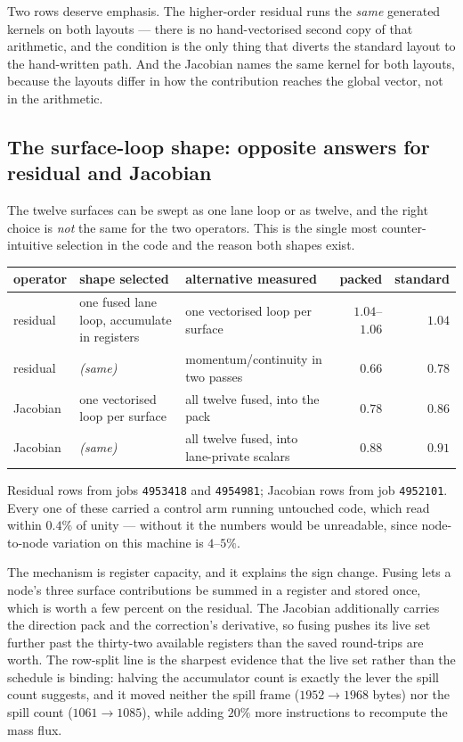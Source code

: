 Two rows deserve emphasis. The higher-order residual runs the \emph{same} generated kernels on
both layouts --- there is no hand-vectorised second copy of that arithmetic, and the
 condition is the only thing that diverts the standard layout to the hand-written
path. And the Jacobian names the same kernel for both layouts, because the layouts differ in how
the contribution reaches the global vector, not in the arithmetic.

\subsection{The surface-loop shape: opposite answers for residual and Jacobian}
\label{sec:sel:shape}

The twelve surfaces can be swept as one lane loop or as twelve, and the right choice is
\emph{not} the same for the two operators. This is the single most counter-intuitive selection in
the code and the reason both shapes exist.

\begin{center}
\footnotesize
\begin{tabular}{@{}lllrr@{}}
\toprule
operator & shape selected & alternative measured & packed & standard \\
\midrule
residual   & one fused lane loop, accumulate in registers
           & one vectorised loop per surface & $1.04$--$1.06$ & $1.04$ \\
residual   & \emph{(same)}
           & momentum/continuity in two passes & $0.66$ & $0.78$ \\
Jacobian   & one vectorised loop per surface
           & all twelve fused, into the pack & $0.78$ & $0.86$ \\
Jacobian   & \emph{(same)}
           & all twelve fused, into lane-private scalars & $0.88$ & $0.91$ \\
\bottomrule
\end{tabular}
\end{center}

\noindent
Residual rows from jobs \texttt{4953418} and \texttt{4954981}; Jacobian rows from job
\texttt{4952101}. Every one of these carried a control arm running untouched code, which read
within $0.4\%$ of unity --- without it the numbers would be unreadable, since node-to-node
variation on this machine is $4$--$5\%$.

The mechanism is register capacity, and it explains the sign change. Fusing lets a node's three
surface contributions be summed in a register and stored once, which is worth a few percent on
the residual. The Jacobian additionally carries the direction pack and the correction's
derivative, so fusing pushes its live set further past the thirty-two available registers than the
saved round-trips are worth. The row-split line is the sharpest evidence that the live set rather
than the schedule is binding: halving the accumulator count is exactly the lever the spill count
suggests, and it moved neither the spill frame ($1952 \rightarrow 1968$ bytes) nor the spill count
($1061 \rightarrow 1085$), while adding $20\%$ more instructions to recompute the mass flux.


